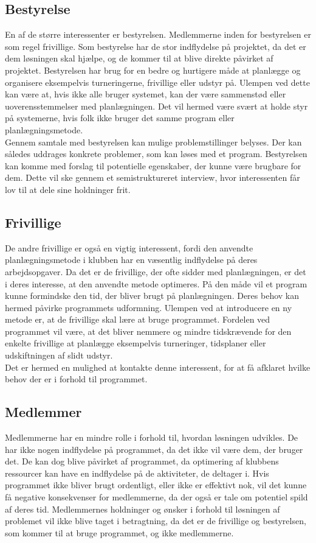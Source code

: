 \subsection*{Bestyrelse}
En af de større interessenter er bestyrelsen. Medlemmerne inden for bestyrelsen er som regel frivillige. Som bestyrelse har de stor indflydelse på projektet, da det er dem løsningen skal hjælpe, og de kommer til at blive direkte påvirket af projektet. Bestyrelsen har brug for en bedre og hurtigere måde at planlægge og organisere eksempelvis turneringerne, frivillige eller udstyr på. Ulempen ved dette kan være at, hvis ikke alle bruger systemet, kan der være sammenstød eller uoverensstemmelser med planlægningen. Det vil hermed være svært at holde styr på systemerne, hvis folk ikke bruger det samme program eller planlægningsmetode.\\ 
Gennem samtale med bestyrelsen kan mulige problemstillinger belyses. Der kan således uddrages konkrete problemer, som kan løses med et program. Bestyrelsen kan komme med forslag til potentielle egenskaber, der kunne være brugbare for dem. Dette vil ske gennem et semistruktureret interview, hvor interessenten får lov til at dele sine holdninger frit.

\subsection*{Frivillige}
De andre frivillige er også en vigtig interessent, fordi den anvendte planlægningsmetode i klubben har en væsentlig indflydelse på deres arbejdsopgaver. Da det er de frivillige, der ofte sidder med planlægningen, er det i deres interesse, at den anvendte metode optimeres. På den måde vil et program kunne formindske den tid, der bliver brugt på planlægningen. Deres behov kan hermed påvirke programmets udformning. Ulempen ved at introducere en ny metode er, at de frivillige skal lære at bruge programmet. Fordelen ved programmet vil være, at det bliver nemmere og mindre tidskrævende for den enkelte frivillige at planlægge eksempelvis turneringer, tidsplaner eller udskiftningen af slidt udstyr.\\
Det er hermed en mulighed at kontakte denne interessent, for at få afklaret hvilke behov der er i forhold til programmet.

\subsection*{Medlemmer}
Medlemmerne har en mindre rolle i forhold til, hvordan løsningen udvikles. De har ikke nogen indflydelse på programmet, da det ikke vil være dem, der bruger det. De kan dog blive påvirket af programmet, da optimering af klubbens ressourcer kan have en indflydelse på de aktiviteter, de deltager i. Hvis programmet ikke bliver brugt ordentligt, eller ikke er effektivt nok, vil det kunne få negative konsekvenser for medlemmerne, da der også er tale om potentiel spild af deres tid. Medlemmernes holdninger og ønsker i forhold til løsningen af problemet vil ikke blive taget i betragtning, da det er de frivillige og bestyrelsen, som kommer til at bruge programmet, og ikke medlemmerne.

